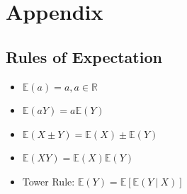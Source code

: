\documentclass[11pt]{article}
\newcommand{\R}{\mathbb R}			%
\theoremstyle{definition}
\numberwithin{equation}{section}
\begin{document}
\newpage

\section{Appendix}

\subsection{Rules of Expectation}

\begin{itemize}
\item $\mathbb{E}(a) = a, a\in\R$
\item $\mathbb{E}(aY) = a\mathbb{E}(Y)$
\item $\mathbb{E}(X\pm Y) = \mathbb{E}(X) \pm \mathbb{E}(Y)$
\item $\mathbb{E}(XY) = \mathbb{E}(X)\mathbb{E}(Y)$
\item Tower Rule: $\mathbb{E}(Y) = \mathbb{E}[\mathbb{E}(Y\>|\>X)]$
\end{itemize}

  
\end{document}
